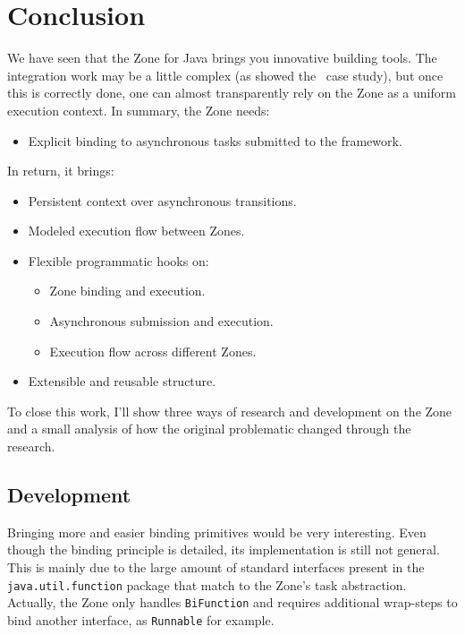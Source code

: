 
\chapter{Conclusion}
\label{ch:conclusion}

We have seen that the Zone for Java brings you innovative building tools. The integration work may be a little complex (as showed the \vertx\ case study), but once this is correctly done, one can almost transparently rely on the Zone as a uniform execution context. In summary, the Zone needs:
\begin{itemize}
\item Explicit binding to asynchronous tasks submitted to the framework.
\end{itemize}

In return, it brings:
\begin{itemize}
\item Persistent context over asynchronous transitions.
\item Modeled execution flow between Zones.
\item Flexible programmatic hooks on:
  \begin{itemize}
  \item Zone binding and execution.
  \item Asynchronous submission and execution.
  \item Execution flow across different Zones.
  \end{itemize}
\item Extensible and reusable structure.
\end{itemize}

To close this work, I'll show three ways of research and development on the Zone and a small analysis of how the original problematic changed through the research.

\section{Development}

Bringing more and easier binding primitives would be very interesting. Even though the binding principle is detailed, its implementation is still not general. This is mainly due to the large amount of standard interfaces present in the \lstinline{java.util.function} package that match to the Zone's task abstraction. Actually, the Zone only handles \lstinline{BiFunction} and requires additional wrap-steps to bind another interface, as \lstinline{Runnable} for example.

